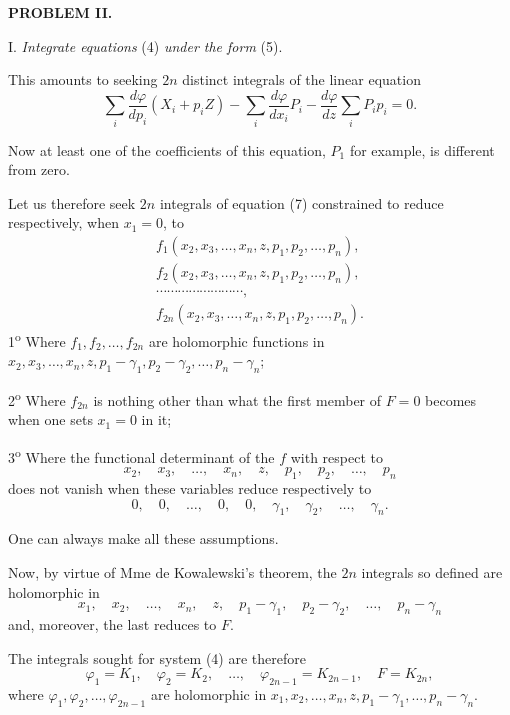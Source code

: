 \documentclass[11pt]{article}
\begin{document}
\begin{center}
\textbf{PROBLEM II.}
\end{center}

I. \emph{Integrate equations} (4) \emph{under the form} (5).

This amounts to seeking $2n$ distinct integrals of the linear equation
\begin{equation*}\tag{7}
\sum_i \frac{d\varphi}{dp_i}(X_i+p_iZ)-\sum_i \frac{d\varphi}{dx_i}P_i-
\frac{d\varphi}{dz}\sum_i P_ip_i=0.
\end{equation*}

Now at least one of the coefficients of this equation, $P_1$ for example, is different from zero.

Let us therefore seek $2n$ integrals of equation (7) constrained to reduce respectively, when $x_1=0$, to
\[
\begin{gathered}
f_1(x_2,x_3,\ldots,x_n,z,p_1,p_2,\ldots,p_n),\\
f_2(x_2,x_3,\ldots,x_n,z,p_1,p_2,\ldots,p_n),\\
\cdots\cdots\cdots\cdots\cdots\cdots\cdots\cdots,\\
f_{2n}(x_2,x_3,\ldots,x_n,z,p_1,p_2,\ldots,p_n).
\end{gathered}
\]
1\textsuperscript{o} Where $f_1,f_2,\ldots,f_{2n}$ are holomorphic functions in $x_2,x_3,\ldots,x_n,z,p_1-\gamma_1,p_2-\gamma_2,\ldots,p_n-\gamma_n$;

2\textsuperscript{o} Where $f_{2n}$ is nothing other than what the first member of $F=0$ becomes when one sets $x_1=0$ in it;

3\textsuperscript{o} Where the functional determinant of the $f$ with respect to
\[
x_2,\quad x_3,\quad \ldots,\quad x_n,\quad z,\quad p_1,\quad p_2,\quad \ldots,\quad p_n
\]
does not vanish when these variables reduce respectively to
\[
0,\quad 0,\quad \ldots,\quad 0,\quad 0,\quad \gamma_1,\quad \gamma_2,\quad \ldots,\quad \gamma_n.
\]

One can always make all these assumptions.

Now, by virtue of Mme de Kowalewski's theorem, the $2n$ integrals so defined are holomorphic in
\[
x_1,\quad x_2,\quad \ldots,\quad x_n,\quad z,\quad p_1-\gamma_1,\quad p_2-\gamma_2,\quad \ldots,\quad p_n-\gamma_n
\]
and, moreover, the last reduces to $F$.

The integrals sought for system (4) are therefore
\[
\varphi_1=K_1,\quad \varphi_2=K_2,\quad \ldots,\quad \varphi_{2n-1}=K_{2n-1},\quad F=K_{2n},
\]
where $\varphi_1,\varphi_2,\ldots,\varphi_{2n-1}$ are holomorphic in $x_1,x_2,\ldots,x_n,z,p_1-\gamma_1,\ldots,p_n-\gamma_n$.
\end{document}

